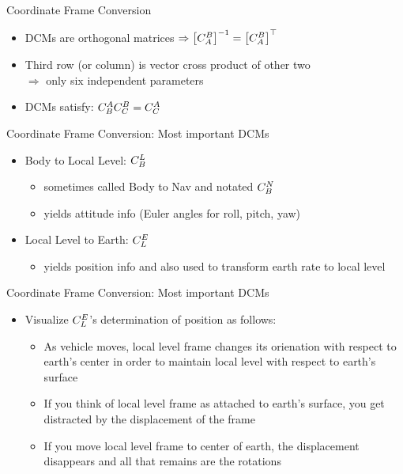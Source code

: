\begin{frame}
Coordinate Frame Conversion
 \begin{itemize}
 \item DCMs are orthogonal matrices $\Rightarrow \left[C_{A}^{B} \right]^{-1}=\left[C_{A}^{B} \right]^\top$
 \item Third row (or column) is vector cross product of other two\\
 $\Rightarrow$ only six independent parameters
 \item DCMs satisfy:   $C_{B}^{A}C_{C}^{B}=C_{C}^{A}$
\end{itemize}
\end{frame}
\begin{frame}
Coordinate Frame Conversion: Most important DCMs
 \begin{itemize}
 \item Body to Local Level: $C_{B}^{L}$
 \begin{itemize}
 \item sometimes called Body to Nav and notated $C_{B}^{N}$
 \item yields attitude info (Euler angles for roll, pitch, yaw)
 \end{itemize}
 \item Local Level to Earth: $C_{L}^{E}$
 \begin{itemize}
 \item yields position info and also used to transform earth rate to
 local level
 \end{itemize}
\end{itemize}
\end{frame}
\begin{frame}
Coordinate Frame Conversion: Most important DCMs
\begin{itemize}
  \item Visualize $C_{L}^{E}$'s determination of position as follows:
	\begin{itemize}
		\item As vehicle moves, local level frame changes its orienation with respect to earth's center in order to maintain local level with respect to earth's surface
		\item If you think of local level frame as attached to earth's surface, you get distracted by the displacement of the frame
		\item If you move local level frame to center of earth, the displacement disappears and all that remains are the rotations
	\end{itemize} 
\end{itemize} 
\end{frame}

\begin{frame}


\end{frame}